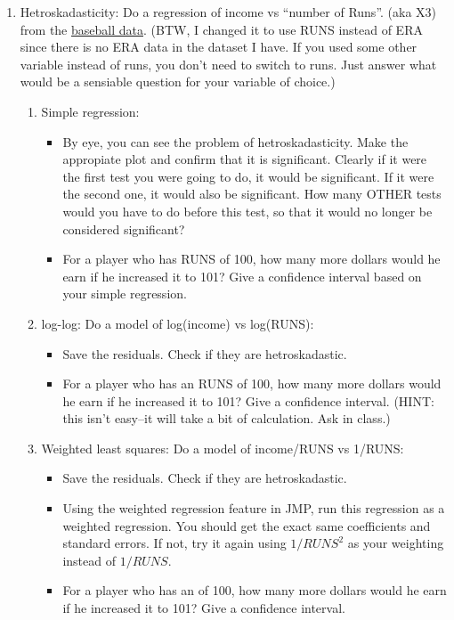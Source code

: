 \documentclass[11pt]{article}
\begin{document}
\begin{enumerate}
\item Hetroskadasticity: Do a regression of income vs ``number of
Runs''. (aka X3) from the \href{http://www4.stat.ncsu.edu/~boos/var.select/baseball.html}{baseball data}.
(BTW, I changed it to use RUNS instead of ERA since there is no ERA
data in the dataset I have.  If you used some other variable instead
of runs, you don't need to switch to runs.  Just answer what would be
a sensiable question for your variable of choice.)
\begin{enumerate}
\item Simple regression:
\begin{itemize}
\item By eye, you can see the problem of hetroskadasticity.  Make the
appropiate plot and confirm that it is significant.  Clearly if it
were the first test you were going to do, it would be significant.  If
it were the second one, it would also be significant.  How many OTHER
tests would you have to do before this test, so that it would no
longer be considered significant?
\item For a player who has RUNS of 100, how many more dollars would
he earn if he increased it to 101?  Give a confidence interval based
on your simple regression.
\end{itemize}
\item log-log:  Do a model of log(income) vs log(RUNS):
\begin{itemize}
\item  Save the residuals.  Check if they are hetroskadastic.
\item For a player who has an RUNS of 100, how many more dollars would
he earn if he increased it to 101?  Give a confidence interval. (HINT:
this isn't easy--it will take a bit of calculation.  Ask in class.)
\end{itemize}
\item Weighted least squares:  Do a model of income/RUNS vs 1/RUNS:
\begin{itemize}
\item  Save the residuals.  Check if they are hetroskadastic.
\item Using the weighted regression feature in JMP, run this
regression as a weighted regression.  You should get the exact same
coefficients and standard errors.  If not, try it again using
$1/RUNS^2$ as your weighting instead of $1/RUNS$.
\item For a player who has an  of 100, how many more dollars would
he earn if he increased it to 101?  Give a confidence interval. 

\end{itemize}
\end{enumerate}
\end{enumerate}
\end{document}
